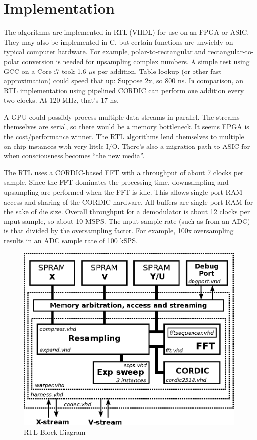 \section{Implementation}

The algorithms are implemented in RTL (VHDL) for use on an FPGA or ASIC.
They may also be implemented in C, but certain functions are unwieldy on
typical computer hardware. For example, polar-to-rectangular and
rectangular-to-polar conversion is needed for upsampling complex numbers.
A simple test using GCC on a Core i7 took 1.6 $\mu$s per addition.
Table lookup (or other fast approximation) could speed that up:
Suppose 2x, so 800 ns.
In comparison, an RTL implementation using pipelined CORDIC can perform
one addition every two clocks. At 120 MHz, that's 17 ns.

A GPU could possibly process multiple data streams in parallel.
The streams themselves are serial, so there would be a memory bottleneck.
It seems FPGA is the cost/performance winner.
The RTL algorithms lend themselves to multiple on-chip instances with very
little I/O. There's also a migration path to ASIC for when consciousness
becomes ``the new media''.

The RTL uses a CORDIC-based FFT with a throughput of about 7 clocks per sample.
Since the FFT dominates the processing time, downsampling and upsampling
are performed when the FFT is idle.
This allows single-port RAM access and sharing of the CORDIC hardware. 
All buffers are single-port RAM for the sake of die size.
Overall throughput for a demodulator is about 12 clocks per input sample,
so about 10 MSPS. The input sample rate (such as from an ADC) is that divided
by the oversampling factor. For example, 100x oversampling results in
an ADC sample rate of 100 kSPS.

\begin{figure}
	\centering
	\includegraphics[width=0.8\linewidth]{../source/rtl_e}
	\caption[Quantum to Relative Time Hardware]{RTL Block Diagram}
	\label{fig:rtl}
\end{figure}

